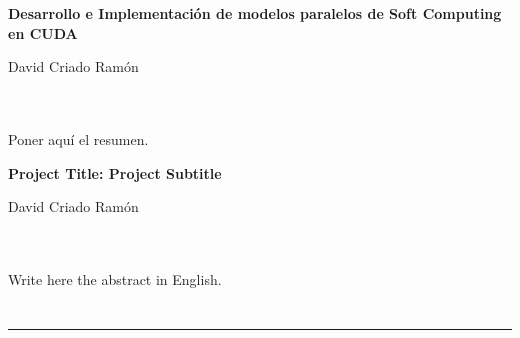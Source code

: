 \chapter*{}


%



\cleardoublepage
\thispagestyle{empty}

\begin{center}
{\large\bfseries Desarrollo e Implementación de modelos paralelos de Soft Computing en CUDA}\\
\end{center}
\begin{center}
David Criado Ramón\\
\end{center}

\\

\vspace{0.7cm}
\\

Poner aquí el resumen.
\cleardoublepage


\thispagestyle{empty}


\begin{center}
{\large\bfseries Project Title: Project Subtitle}\\
\end{center}
\begin{center}
David Criado Ramón\\
\end{center}

\\

\vspace{0.7cm}
\\

Write here the abstract in English.

\chapter*{}
\thispagestyle{empty}

\noindent\rule[-1ex]{\textwidth}{2pt}\\[4.5ex]

